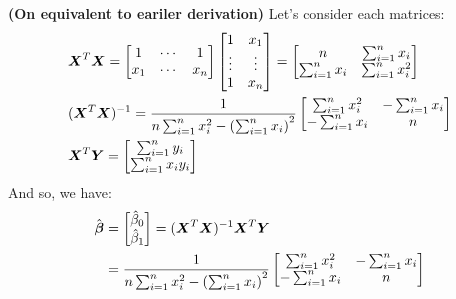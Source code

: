 \begin{remark}{\textbf{(On equivalent to eariler derivation)}}
    Let's consider each matrices:
    \begin{equation*}
    \begin{aligned}
        &\boldsymbol X^T\boldsymbol X = 
        \begin{bmatrix}
            1 & \cdots & 1 \\
            x_1 & \cdots & x_n
        \end{bmatrix}
        \begin{bmatrix}
            1 & x_1 \\
            \vdots & \vdots \\
            1 & x_n
        \end{bmatrix} = 
        \begin{bmatrix}
            n & \sum^n_{i=1}x_i \\
            \sum^n_{i=1}x_i & \sum^n_{i=1}x_i^2
        \end{bmatrix} \\
        &(\boldsymbol X^T\boldsymbol X)^{-1} = \frac{1}{n\sum^n_{i=1}x_i^2 - \left( \sum^n_{i=1}x_i \right)^2} 
        \begin{bmatrix}
            \sum^n_{i=1}x_i^2 & -\sum^n_{i=1}x_i \\
            -\sum^n_{i=1}x_i & n 
        \end{bmatrix} \\
        &\boldsymbol X^T\boldsymbol Y = \begin{bmatrix}
            \sum^n_{i=1}y_i \\ \sum^n_{i=1}x_iy_i
        \end{bmatrix}
    \end{aligned}
    \end{equation*}
    And so, we have:
    \begin{equation*}
    \begin{aligned}
        \hat{\boldsymbol \beta} &= \begin{bmatrix}
            \hat{\beta}_0 \\ \hat{\beta}_1 
        \end{bmatrix} = (\boldsymbol X^T\boldsymbol X)^{-1}\boldsymbol X^T\boldsymbol Y \\
        &= \frac{1}{n\sum^n_{i=1}x_i^2 - \left( \sum^n_{i=1}x_i \right)^2} 
        \begin{bmatrix}
            \sum^n_{i=1}x_i^2 & -\sum^n_{i=1}x_i \\
            -\sum^n_{i=1}x_i & n 

\end{bmatrix}
\end{aligned}
\end{equation*}
\end{remark}
